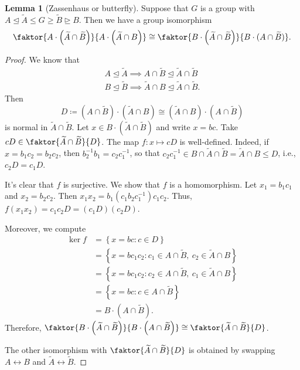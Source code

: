\documentclass[10pt,letterpaper,cm]{nupset}
\theoremstyle{definition}
\theoremstyle{theorem}
\newtheorem{lemma}[definition]{Lemma}
\theoremstyle{remark}
\newcommand{\1}{\mathbf{1}}
\newcommand{\0}{\vec 0}
\begin{document}
\begin{lemma}[Zassenhaus or butterfly]
Suppose that $G$ is a group with $A \unlhd \widetilde{A} \leq G \geq \widetilde{B} \unrhd B$. Then we have a group isomorphism $$\faktor{A\cdot \left(\widetilde{A} \cap \widetilde{B}\right)}{A \cdot \left(\widetilde{A} \cap B\right)} \cong \faktor{B \cdot \left(\widetilde{A} \cap \widetilde{B}\right)}{B\cdot (A \cap \widetilde{B})}.$$
\end{lemma}
\begin{proof}
We know that \begin{gather*}
A \unlhd \widetilde{A} \implies A \cap \widetilde{B} \unlhd \widetilde{A} \cap \widetilde{B} 
\\ B \unlhd \widetilde{B} \implies \widetilde{A} \cap B \unlhd \widetilde{A} \cap \widetilde{B}.
\end{gather*} 
Then $$D\coloneqq  \left({A} \cap \widetilde{B}\right) \cdot \left(\widetilde{A} \cap {B}\right) \cong  \left(\widetilde{A} \cap {B}\right) \cdot \left({A} \cap \widetilde{B}\right)$$ is normal in $\widetilde{A} \cap \widetilde{B}$. Let $x \in B \cdot \left(\widetilde{A} \cap \widetilde{B}\right)$ and write $x = bc$. Take $cD \in \faktor{\widetilde{A} \cap \widetilde{B}}{D}$. The map $f: x \mapsto cD$ is well-defined. Indeed, if $x = b_1c_2 = b_2c_2$, then $b_2^{-1}b_1 = c_2c_1^{-1}$, so that $c_2c_1^{-1} \in B \cap \widetilde{A} \cap \widetilde{B} = \widetilde{A}\cap B \leq D$, i.e., $c_2D = c_1D$.

\medskip

It's clear that $f$ is surjective. We show that $f$ is a homomorphism. Let $x_1= b_1c_1$ and $x_2 = b_2c_2$. Then $x_1x_2 = b_1(c_1b_2c_1^{-1})c_1c_2$. Thus, $f(x_1x_2) = c_1c_2D = \left(c_1D\right)\left(c_2D\right)$.

\medskip


Moreover, we compute 
\begin{align*} 
\ker{f} &= \left\{x = bc : c \in D\right\}  
\\ & = \left\{ x= bc_1c_2 : c_1\in {A} \cap \widetilde{B}, \  c_2 \in \widetilde{A} \cap {B}\right\}
\\ & = \left\{ x= bc_1c_2 : c_2\in {A} \cap \widetilde{B}, \  c_1 \in \widetilde{A} \cap {B}\right\} 
\\ & = \left\{x = bc : c \in A \cap \widetilde{B}\right\} 
\\  & = B \cdot \left(A \cap \widetilde{B}\right).
\end{align*} Therefore, $\faktor{B \cdot \left(\widetilde{A} \cap \widetilde{B}\right)}{ B \cdot \left(A \cap \widetilde{B}\right)} \cong \faktor{\widetilde{A} \cap \widetilde{B}}{D}$. 

\medskip

 The other isomorphism with $\faktor{\widetilde{A} \cap \widetilde{B}}{D}$ is obtained by swapping $A \longleftrightarrow B$ and $\widetilde{A} \longleftrightarrow \widetilde{B}$.
\end{proof}
\end{document}
